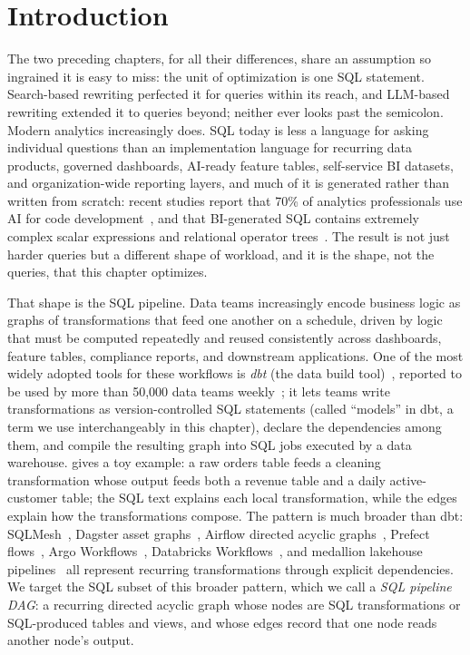 \section{Introduction}\label{dag:sec:intro}

The two preceding chapters, for all their differences, share an
assumption so ingrained it is easy to miss: the unit of optimization
is one SQL statement. Search-based rewriting perfected it for queries
within its reach, and LLM-based rewriting extended it to queries
beyond; neither ever looks past the semicolon. Modern analytics
increasingly does. SQL today is less a language for asking individual
questions than an implementation language for recurring data products,
governed dashboards, AI-ready feature tables, self-service BI
datasets, and organization-wide reporting layers, and much of it is
generated rather than written from scratch: recent studies report that
70\% of analytics professionals use AI for code
development~\cite{dbt2025state}, and that BI-generated SQL contains
extremely complex scalar expressions and relational operator
trees~\cite{getreal2018}. The result is not just harder queries but a
different shape of workload, and it is the shape, not the queries,
that this chapter optimizes.

That shape is the SQL pipeline. Data teams increasingly encode
business logic as graphs of transformations that feed one another on a
schedule, driven by logic that must be computed repeatedly and reused
consistently across dashboards, feature tables, compliance reports,
and downstream applications. One of the most widely adopted tools for
these workflows is \emph{dbt} (the data build
tool)~\cite{dbtWhatExactly}, reported to be used by more than 50,000
data teams weekly~\cite{dbtComplexity}; it lets teams write
transformations as version-controlled SQL  statements
(called ``models'' in dbt, a term we use interchangeably in this
chapter), declare the dependencies among them, and compile the
resulting graph into SQL jobs executed by a data warehouse.
 gives a toy example: a raw orders table feeds
a cleaning transformation whose output feeds both a revenue table and
a daily active-customer table; the SQL text explains each local
transformation, while the edges explain how the transformations
compose. The pattern is much broader than dbt:
SQLMesh~\cite{sqlmeshOverview}, Dagster asset
graphs~\cite{dagsterAssets}, Airflow directed acyclic
graphs~\cite{airflowDags}, Prefect flows~\cite{prefectTasks}, Argo
Workflows~\cite{argoDag}, Databricks Workflows~\cite{databricksJobs},
and medallion lakehouse pipelines~\cite{databricksMedallion} all
represent recurring transformations through explicit dependencies. We
target the SQL subset of this broader pattern, which we call a
\emph{SQL pipeline DAG}: a recurring directed acyclic graph whose
nodes are SQL transformations or SQL-produced tables and views, and
whose edges record that one node reads another node's output.

